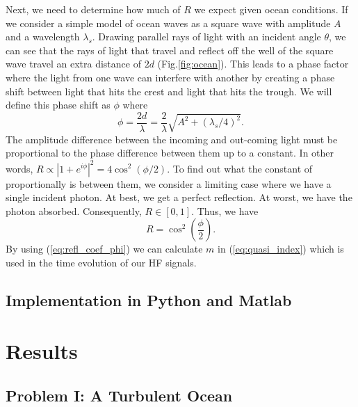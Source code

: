\documentclass[11pt]{article}
\numberwithin{equation}{section}
\begin{document}
Next, we need to determine how much of $R$ we expect given ocean conditions. If we consider a simple model of ocean waves as a square wave with amplitude $A$ and a wavelength $\lambda_s$. Drawing parallel rays of light with an incident angle $\theta$, we can see that the rays of light that travel and reflect off the well of the square wave travel an extra distance of $2d$ (Fig.\ref{fig:ocean}). This leads to a phase factor where the light from one wave can interfere with another by creating a phase shift between light that hits the crest and light that hits the trough. We will define this phase shift as $\phi$ where 
\begin{equation}
    \phi = \frac{2d}{\lambda} = \frac{2}{\lambda}\sqrt{A^2 + (\lambda_s/4)^2}.
\end{equation}
The amplitude difference between the incoming and out-coming light must be proportional to the phase difference between them up to a constant. In other words, $R \propto |1+e^{i\phi}|^2 = 4 \cos^2(\phi/2)$. To find out what the constant of proportionally is between them, we consider a limiting case where we have a single incident photon. At best, we get a perfect reflection. At worst, we have the photon absorbed. Consequently, $R \in [0,1]$. Thus, we have
\begin{equation}
    R = \cos^2\left(\frac\phi2\right).
    \label{eq:refl_coef_phi}
\end{equation}
By using (\ref{eq:refl_coef_phi}) we can calculate $m$ in (\ref{eq:quasi_index}) which is used in the time evolution of our HF signals.




\subsection{Implementation in Python and Matlab}


\section{Results} %
\label{sec:results}

 \subsection{Problem I: A Turbulent Ocean} %
 \label{sub:part_i}
\end{document}

